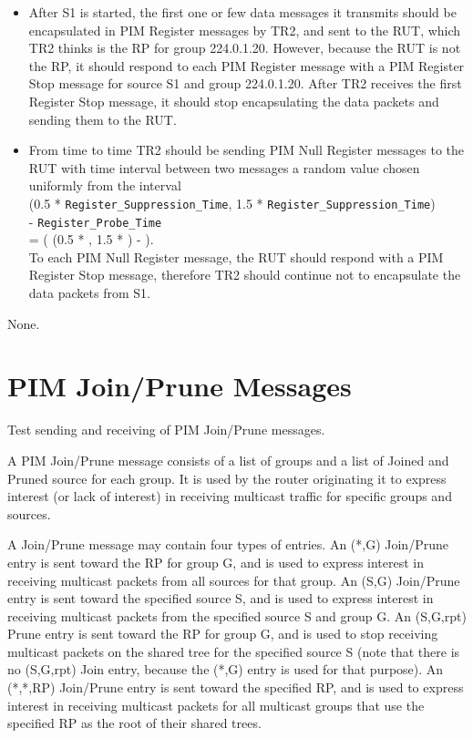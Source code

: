 \documentclass[11pt]{report}
\begin{document}
\begin{itemize}

  \item After S1 is started, the first one or few data messages it transmits
  should be encapsulated in PIM Register messages by TR2, and sent to the RUT,
  which TR2 thinks is the RP for group 224.0.1.20.
  However, because the RUT is not the RP, it should respond to each PIM
  Register message with a PIM Register Stop message for source S1 and group
  224.0.1.20. After TR2 receives the first Register Stop message, it should
  stop encapsulating the data packets and sending them to the RUT.

  \item From time to time TR2 should be sending PIM Null Register
  messages to the RUT with time interval between two messages a random
  value chosen uniformly from the interval \\
  (0.5 * \verb=Register_Suppression_Time=,
  1.5 * \verb=Register_Suppression_Time=) \\
  - \verb=Register_Probe_Time= \\
  = ( (0.5 * {\PimsmRegisterSuppressionTime}, 1.5 *
  {\PimsmRegisterSuppressionTime}) - {\PimsmRegisterProbeTime} ). \\
  To each PIM Null Register message, the RUT should respond with a
  PIM Register Stop message, therefore TR2 should continue not to
  encapsulate the data packets from S1.

\end{itemize}

None.


\chapter{PIM Join/Prune Messages}

Test sending and receiving of PIM Join/Prune messages.

A PIM Join/Prune message consists of a list of groups and a list of
Joined and Pruned source for each group. It is used by the router
originating it to express interest (or lack of interest) in receiving
multicast traffic for specific groups and sources.

A Join/Prune message may contain four types of entries. An (*,G)
Join/Prune entry is sent toward the RP for group G, and is used to
express interest in receiving multicast packets from all sources for
that group. An (S,G) Join/Prune entry is sent toward the specified
source S, and is used to express interest in receiving multicast packets
from the specified source S and group G. An (S,G,rpt) Prune entry is
sent toward the RP for group G, and is used to stop receiving multicast
packets on the shared tree for the specified source S (note that there
is no (S,G,rpt) Join entry, because the (*,G) entry is used for that
purpose). An (*,*,RP) Join/Prune entry is sent toward the specified RP,
and is used to express interest in receiving multicast packets for all
multicast groups that use the specified RP as the root of their shared
trees.
\end{document}
